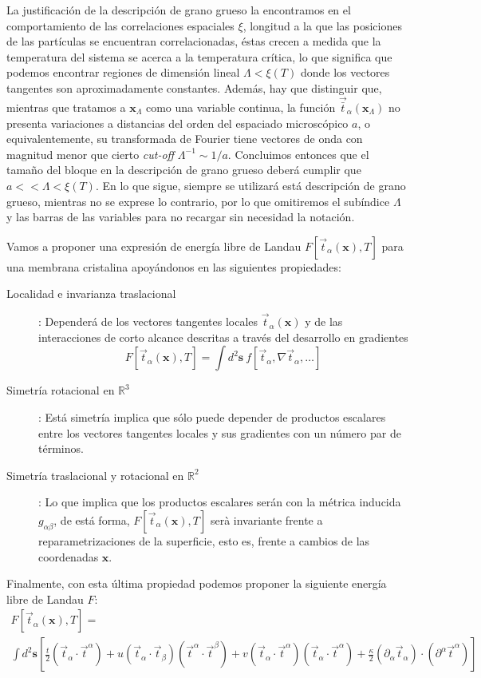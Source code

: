La justificación de la descripción de grano grueso la encontramos en el
comportamiento de las correlaciones espaciales $\xi$, longitud a la que las
posiciones de las partículas se encuentran correlacionadas, éstas crecen a
medida que la temperatura del sistema se acerca a la temperatura crítica, lo
que significa que podemos encontrar regiones de dimensión lineal
$\Lambda<\xi(T)$ donde los vectores tangentes son aproximadamente
constantes. Además, hay que distinguir que, mientras que tratamos a
$\mathbf{x}_{\Lambda}$ como una variable continua, la función 
$\vec{\bar{t}}_{\alpha}(\mathbf{x}_{\Lambda})$ no presenta variaciones a distancias
del orden del espaciado microscópico $a$, o equivalentemente, su transformada
de Fourier tiene vectores de onda con magnitud menor que cierto \textit{cut-off}
$\Lambda^{-1} \sim 1/a$. Concluimos entonces que el tamaño del bloque en la
descripción de grano grueso deberá cumplir que $a<<\Lambda<\xi(T)$. En lo que
sigue, siempre se utilizará está descripción de grano grueso, mientras no se
exprese lo contrario, por lo que omitiremos el subíndice $\Lambda$ y las
barras de las variables para no recargar sin necesidad la notación.

Vamos a proponer una expresión de energía libre de Landau
$F[\vec{t}_{\alpha}(\mathbf{x}),T]$ para una membrana cristalina
apoyándonos en las siguientes propiedades:
\begin{description}
\item[Localidad e invarianza traslacional]: Dependerá de los vectores
  tangentes locales $\vec{t}_{\alpha}(\mathbf{x})$ y de las
  interacciones de corto alcance descritas a través del desarrollo en gradientes
  $$ F[\vec{t}_{\alpha}(\mathbf{x}),T]=\int\! d^2\mathbf{s}\ f[\vec{t}_{\alpha},\nabla
  \vec{t}_{\alpha},\dots]$$ 
\item[Simetría rotacional en $\mathbb{R}^3$]: Está simetría implica que sólo
  puede depender de productos escalares entre los vectores tangentes
  locales y sus gradientes con un número par de términos. 

\item[Simetría traslacional y rotacional en $\mathbb{R}^2$]: Lo que implica
  que los productos escalares serán con la métrica inducida $g_{\alpha\beta}$,
  de está forma, $F[\vec{t}_{\alpha}(\mathbf{x}),T]$ serà invariante frente a
  reparametrizaciones de la superficie, esto es, frente a cambios de 
  las coordenadas $\mathbf{x}$.
\end{description}

 Finalmente, con esta última propiedad podemos proponer la siguiente energía libre de Landau $F$:
  \begin{multline}\label{ELandau}
    F[\vec{t}_{\alpha}(\mathbf{x}),T]=\\
\int d^2\mathbf{s}
    \left[
      \frac{t}{2}(\vec{t}_{\alpha}\cdot\vec{t}^{\alpha})+
      u(\vec{t}_{\alpha}\cdot\vec{t}_{\beta})(\vec{t}^{\alpha}\cdot\vec{t}^{\beta})+
      v(\vec{t}_{\alpha}\cdot\vec{t}^{\alpha})(\vec{t}_{\alpha}\cdot\vec{t}^{\alpha})+
      \frac{\kappa}{2}(\partial_{\alpha}\vec{t}_{\alpha})\cdot(\partial^{\alpha}\vec{t}^{\alpha}) \right]
  \end{multline}



